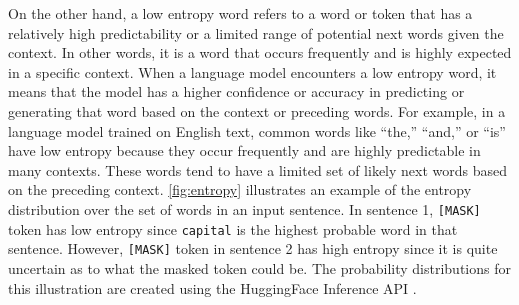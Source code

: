 On the other hand, a low entropy word refers to a word or token that has a relatively high predictability or a limited range of potential next words given the context. In other words, it is a word that occurs frequently and is highly expected in a specific context. When a language model encounters a low entropy word, it means that the model has a higher confidence or accuracy in predicting or generating that word based on the context or preceding words. For example, in a language model trained on English text, common words like ``the,'' ``and,'' or ``is'' have low entropy because they occur frequently and are highly predictable in many contexts. These words tend to have a limited set of likely next words based on the preceding context. \cref{fig:entropy} illustrates an example of the entropy distribution over the set of words in an input sentence. In sentence 1, \texttt{[MASK]} token has low entropy since \texttt{capital} is the highest probable word in that sentence.  However, \texttt{[MASK]} token in sentence 2 has high entropy since it is quite uncertain as to what the masked token could be. The probability distributions for this illustration are created using the HuggingFace Inference API \cite{HuggingFaceInfAPI}.





